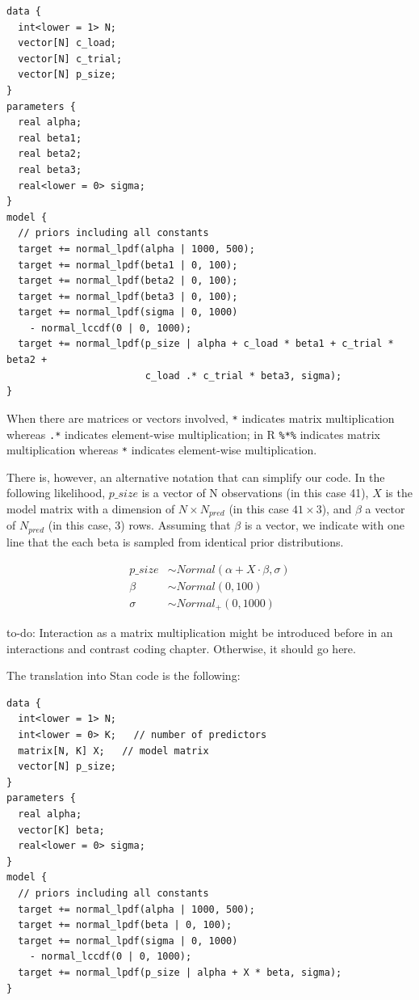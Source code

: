 \documentclass[12pt,]{krantz}
\makeatletter
\newenvironment{kframe}{%
\medskip{}
\setlength{\fboxsep}{.8em}
 \def\at@end@of@kframe{}%
 \ifinner\ifhmode%
  \def\at@end@of@kframe{\end{minipage}}%
  \begin{minipage}{\columnwidth}%
 \fi\fi%
 \def\FrameCommand##1{\hskip\@totalleftmargin \hskip-\fboxsep
 \colorbox{shadecolor}{##1}\hskip-\fboxsep
     \hskip-\linewidth \hskip-\@totalleftmargin \hskip\columnwidth}%
 \MakeFramed {\advance\hsize-\width
   \@totalleftmargin\z@ \linewidth\hsize
   \@setminipage}}%
 {\par\unskip\endMakeFramed%
 \at@end@of@kframe}
\newenvironment{rmdblock}[1]
  {
  \begin{itemize}
  \renewcommand{\labelitemi}{
    \raisebox{-.7\height}[0pt][0pt]{
      {\setkeys{Gin}{width=3em,keepaspectratio}\texttt{[image: images/\#1]}}
    }
  }
  \setlength{\fboxsep}{1em}
  \begin{kframe}
  \item
  }
  {
  \end{kframe}
  \end{itemize}
  }
\newenvironment{rmdnote}
  {\begin{rmdblock}{note}}
  {\end{rmdblock}}
\theoremstyle{definition}
\theoremstyle{definition}
\theoremstyle{definition}
\theoremstyle{remark}
\makeatother
\begin{document}
\begin{verbatim}
data {
  int<lower = 1> N;
  vector[N] c_load;
  vector[N] c_trial;
  vector[N] p_size;
}
parameters {
  real alpha;
  real beta1;
  real beta2;
  real beta3;
  real<lower = 0> sigma;
}
model {
  // priors including all constants
  target += normal_lpdf(alpha | 1000, 500);
  target += normal_lpdf(beta1 | 0, 100);
  target += normal_lpdf(beta2 | 0, 100);
  target += normal_lpdf(beta3 | 0, 100);
  target += normal_lpdf(sigma | 0, 1000)
    - normal_lccdf(0 | 0, 1000);
  target += normal_lpdf(p_size | alpha + c_load * beta1 + c_trial * beta2 +
                        c_load .* c_trial * beta3, sigma);
}
\end{verbatim}

When there are matrices or vectors involved, \texttt{*} indicates matrix multiplication whereas \texttt{.*} indicates element-wise multiplication; in R \texttt{\%*\%} indicates matrix multiplication whereas \texttt{*} indicates element-wise multiplication.

There is, however, an alternative notation that can simplify our code. In the following likelihood, \(p\_size\) is a vector of N observations (in this case 41), \(X\) is the model matrix with a dimension of \(N \times N_{pred}\) (in this case \(41 \times 3\)), and \(\beta\) a vector of \(N_{pred}\) (in this case, 3) rows. Assuming that \(\beta\) is a vector, we indicate with one line that the each beta is sampled from identical prior distributions.

\begin{equation}
\begin{aligned}
p\_size &\sim Normal(\alpha + X \cdot \beta,\sigma)\\
\beta &\sim Normal(0, 100) \\
\sigma &\sim Normal_+(0, 1000)
\end{aligned}
\end{equation}

\begin{rmdnote}
to-do: Interaction as a matrix multiplication might be introduced before in an interactions and contrast coding chapter. Otherwise, it should go here.
\end{rmdnote}

The translation into Stan code is the following:

\begin{verbatim}
data {
  int<lower = 1> N;
  int<lower = 0> K;   // number of predictors
  matrix[N, K] X;   // model matrix
  vector[N] p_size;
}
parameters {
  real alpha;
  vector[K] beta;
  real<lower = 0> sigma;
}
model {
  // priors including all constants
  target += normal_lpdf(alpha | 1000, 500);
  target += normal_lpdf(beta | 0, 100);
  target += normal_lpdf(sigma | 0, 1000)
    - normal_lccdf(0 | 0, 1000);
  target += normal_lpdf(p_size | alpha + X * beta, sigma);
}
\end{verbatim}
\end{document}
